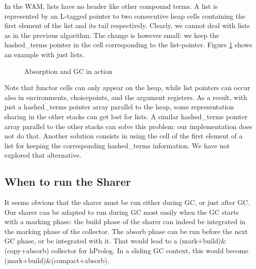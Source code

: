 \documentclass{tlp}
\begin{document}
In the WAM, lists have no header like other compound terms. A list is
represented by an L-tagged pointer to two consecutive heap cells
containing the first element of the list and its tail
respectively. Clearly, we cannot deal with lists as in the previous
algorithm. The change is however small: we keep the hashed\_terms
pointer in the cell corresponding to the list-pointer.  Figure
\ref{fig:pic3} shows an example with just lists.

\begin{figure}[h]
\begin{centering}
\caption{Absorption and GC in action}
\label{fig:pic3}
\end{centering}
\end{figure}


\begin{sloppypar}
Note that functor cells can only appear on the heap, while
list pointers can occur also in environments, choicepoints, and the
argument registers. As a result, with just a hashed\_terms pointer
array parallel to the heap, some representation sharing in the other
stacks can get lost for lists. A similar hashed\_terms pointer array
parallel to the other stacks can solve this problem: our
implementation does not do that. Another solution consists in using
the cell of the first element of a list for keeping the corresponding
hashed\_terms information. We have not explored that alternative.
\end{sloppypar}


\subsection{When to run the Sharer}

It seems obvious that the sharer must be run either during GC, or just
after GC. Our sharer can be adapted to run during GC most easily when
the GC starts with a marking phase: the build phase of the sharer can
indeed be integrated in the marking phase of the collector. The absorb
phase can be run before the next GC phase, or be integrated with
it. That would lead to a (mark+build)\&(copy+absorb) collector for
hProlog. In a sliding GC context, this would become
(mark+build)\&(compact+absorb).
\end{document}
